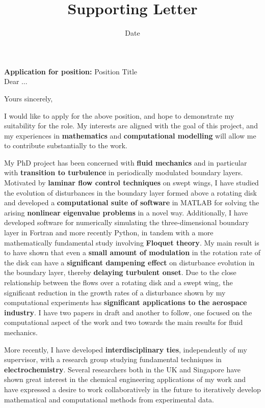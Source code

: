 \documentclass[11pt,a4paper,sans]{moderncv}        %
\title{Supporting Letter}                               %
\begin{document}
\date{Date}
\opening{\textbf{Application for position:} Position Title \\ \vspace{5mm} Dear $\ldots$}
\closing{Yours sincerely,}

\makelettertitle
\justify
\vspace{-6mm}
I would like to apply for the above position, and hope to demonstrate my suitability for the role. My interests are aligned with the goal of this project, and my experiences in \textbf{mathematics} and \textbf{computational modelling} will allow me to contribute substantially to the work.

My PhD project has been concerned with \textbf{fluid mechanics} and in particular with \textbf{transition to turbulence} in periodically modulated boundary layers. Motivated by \textbf{laminar flow control techniques} on swept wings, I have studied the evolution of disturbances in the boundary layer formed above a rotating disk and developed a \textbf{computational suite of software} in MATLAB for solving the arising \textbf{nonlinear eigenvalue problems} in a novel way. Additionally, I have developed software for numerically simulating the three-dimensional boundary layer in Fortran and more recently Python, in tandem with a more mathematically fundamental study involving \textbf{Floquet theory}. My main result is to have shown that even a \textbf{small amount of modulation} in the rotation rate of the disk can have a \textbf{significant dampening effect} on disturbance evolution in the boundary layer, thereby \textbf{delaying turbulent onset}. Due to the close relationship between the flows over a rotating disk and a swept wing, the significant reduction in the growth rates of a disturbance shown by my computational experiments has \textbf{significant applications to the aerospace industry}. I have two papers in draft and another to follow, one focused on the computational aspect of the work and two towards the main results for fluid mechanics. 

More recently, I have developed \textbf{interdisciplinary ties}, independently of my supervisor, with a research group studying fundamental techniques in \textbf{electrochemistry}. Several researchers both in the UK and Singapore have shown great interest in the chemical engineering applications of my work and have expressed a desire to work collaboratively in the future to iteratively develop mathematical and computational methods from experimental data.
\end{document}

